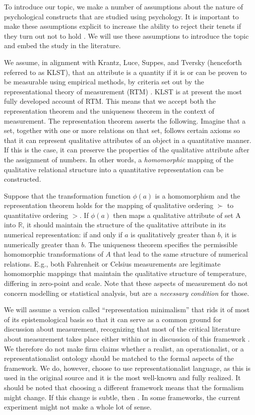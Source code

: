 \documentclass[utf8]{FrontiersinVancouver}
\begin{document}
To introduce our topic, we make a number of assumptions about the nature of psychological constructs that are studied using psychology. It is important to make these assumptions explicit to increase the ability to reject their tenets if they turn out not to hold \citep{meehlTheoreticalRisksTabular2004}. We will use these assumptions to introduce the topic and embed the study in the literature.

We assume, in alignment with Krantz, Luce, Suppes, and Tversky (henceforth referred to as KLST), that an attribute is a quantity if it is or can be proven to be measurable using empirical methods, by criteria set out by the representational theory of measurement (RTM) \citep{krantzFoundationsMeasurement1971}. KLST is at present the most fully developed account of RTM. This means that we accept both the representation theorem and the uniqueness theorem in the context of measurement. The representation theorem asserts the following. Imagine that a set, together with one or more relations on that set, follows certain axioms so that it can represent qualitative attributes of an object in a quantitative manner. If this is the case, it can preserve the properties of the qualitative attribute after the assignment of numbers. In other words, a \textit{homomorphic} mapping of the qualitative relational structure into a quantitative representation can be constructed. 

Suppose that the transformation function $\phi(a)$ is a homomorphism and the representation theorem holds for the mapping of qualitative ordering $\succ$ to quantitative ordering $>$. If $\phi(a)$ then maps a qualitative attribute of set A into $\mathbb{R}$, it should maintain the structure of the qualitative attribute in its numerical representation: if and only if $a$ is qualitatively greater than $b$, it is numerically greater than $b$. The uniqueness theorem specifies the permissible homomorphic transformations of $A$ that lead to the same structure of numerical relations. E.g., both Fahrenheit or Celsius measurements are legitimate homomorphic mappings that maintain the qualitative structure of temperature, differing in zero-point and scale. Note that these aspects of measurement do not concern modelling or statistical analysis, but are a \textit{necessary condition} for those.

We will assume a version called ``representation minimalism'' that rids it of most of its epistemological basis so that it can serve as a common ground for discussion about measurement, recognizing that most of the critical literature about measurement takes place either within or in discussion of this framework \citep{vessonenRepresentationMeasurement2021}. We therefore do not make firm claims whether a realist, an operationalist, or a representationalist ontology should be matched to the formal aspects of the framework. We do, however, choose to use representationalist language, as this is used in the original source and it is the most well-known and fully realized. It should be noted that choosing a different framework means that the formalism might change. If this change is subtle, then . In some frameworks, the current experiment might not make a whole lot of sense.
\end{document}
